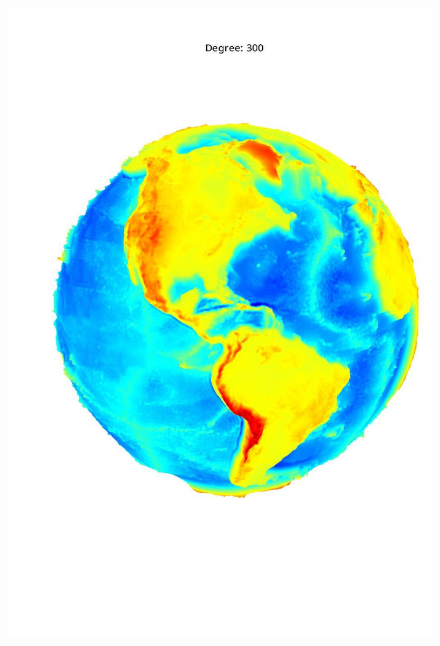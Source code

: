 \documentclass[a4paper]{article}
\theoremstyle{definition}
\begin{document}
\begin{figure}[h!]
\begin{minipage}{.245\textwidth}
        \includegraphics[width=0.95\linewidth]{media/med_300.jpg}
        \label{fig:med300}
    \end{minipage}
    \begin{minipage}{.245\textwidth}
        \centering

\end{minipage}
\end{figure}
\end{document}
